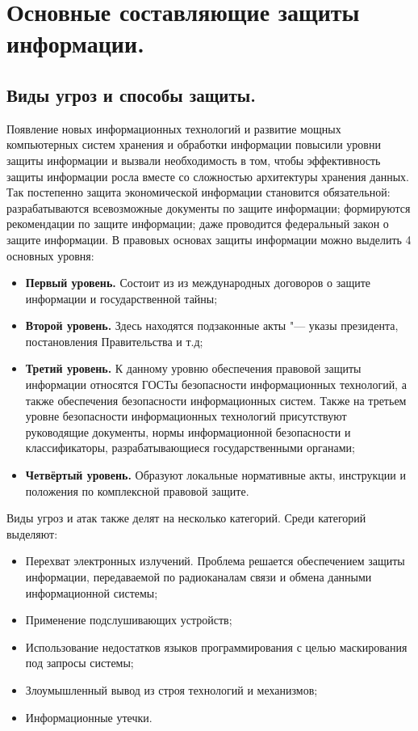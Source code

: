 \section{Основные составляющие защиты информации.}
\subsection{Виды угроз и способы защиты.}
Появление новых информационных технологий и развитие мощных компьютерных систем хранения и обработки информации повысили уровни защиты информации и вызвали 
необходимость в том, чтобы эффективность защиты информации росла вместе со сложностью архитектуры хранения данных. Так постепенно защита экономической информации 
становится обязательной: разрабатываются всевозможные документы по защите информации; формируются рекомендации по защите информации; даже проводится федеральный закон 
о защите информации. В правовых основах защиты информации можно выделить 4 основных уровня:
\begin{itemize}
    \item \textbf{Первый уровень.} Состоит из из международных договоров о защите информации и государственной тайны;
    \item \textbf{Второй уровень.} Здесь находятся подзаконные акты "--- указы президента, постановления Правительства и т.д;
    \item \textbf{Третий уровень.} К данному уровню обеспечения правовой защиты информации относятся ГОСТы безопасности информационных технологий, а также обеспечения безопасности информационных систем.
    Также на третьем уровне безопасности информационных технологий присутствуют руководящие документы, нормы информационной безопасности и классификаторы, разрабатывающиеся 
    государственными органами;
    \item \textbf{Четвёртый уровень.} Образуют локальные нормативные акты, инструкции и положения по комплексной правовой защите\cite{def_inf}.
\end{itemize}
Виды угроз и атак также делят на несколько категорий. Среди категорий выделяют:
\begin{itemize}
    \item Перехват электронных излучений. Проблема решается обеспечением защиты информации, передаваемой по радиоканалам связи и обмена данными 
    информационной системы;
    \item Применение подслушивающих устройств;
    \item Использование недостатков языков программирования с целью маскирования под запросы системы;
    \item Злоумышленный вывод из строя технологий и механизмов;
    \item Информационные утечки.
\end{itemize}

